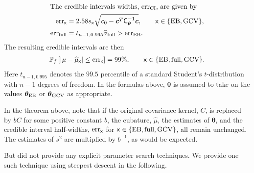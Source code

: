 \documentclass{svjour3}                     %
\newcommand{\bm}[1]{\boldsymbol{#1}}
\newcommand{\vtheta}{{\bm{\theta}}}
\newcommand{\vc}{\bm{c}}
\newcommand{\mCthetaInv}{{\mathsf{C}^{-1}_{\vtheta}}}
\newcommand{\hmu}{\widehat{\mu}}
\newcommand{\hsigma}{\widehat{\sigma}}
\newcommand{\MLE}{\textup{EB}}
\newcommand{\full}{\textup{full}}
\newcommand{\GCV}{\textup{GCV}}
\newcommand{\CI}{\textup{CI}}
\newcommand{\err}{\textup{err}}
\begin{document}
\begin{theorem}
\begin{align}
	\intertext{The credible intervals widths, $\err_{\CI}$, are given by}
	\label{eqn:err_MLEGCV}
	\err_{\mathsf{x}} & = 2.58 s_{\mathsf{x}} \sqrt{c_{0} - \vc^T\mCthetaInv\vc }, \qquad \mathsf{x} \in \{\MLE, \GCV\},  \\ 
	\err_{\textup{full}} 
	& = t_{n-1,0.995} \hsigma_{\textup{full}} > \err_\MLE. \label{FJH:eq:errFull}
	\end{align}
	The resulting credible intervals are then
	\begin{align}
	\label{eqn_prob_CI}
	\mathbb{P}_f \left[
	|\mu-\hmu_{\mathsf{x}}| \leq \err_{\mathsf{x}} \right]  = 99\%, \qquad \mathsf{x} \in \{\MLE, \full, \GCV\}.
	\end{align}
	Here $t_{n-1,0.995}$ denotes the $99.5$ percentile of a standard Student's $t$-distribution with $n-1$ degrees of freedom.  In the formulas above, $\vtheta$ is assumed to take on the values $\vtheta_{\MLE}$ or $\vtheta_{\GCV}$ as appropriate.
\end{theorem}

In the theorem above, note that if the original covariance kernel, $C$, is replaced by $b C$ for some positive constant $b$, the cubature, $\hmu$, the estimates of $\vtheta$, and the credible interval half-widths, $\err_{\mathsf{x}}$ for $\mathsf{x} \in \{\MLE, \full, \GCV\}$, all remain unchanged.  The estimates of $s^2$ are multiplied by $b^{-1}$, as would be expected. 



But \cite{JagHic19a} did not provide any explicit parameter search techniques. We provide one such technique using steepest descent in the following. 
\end{document}

